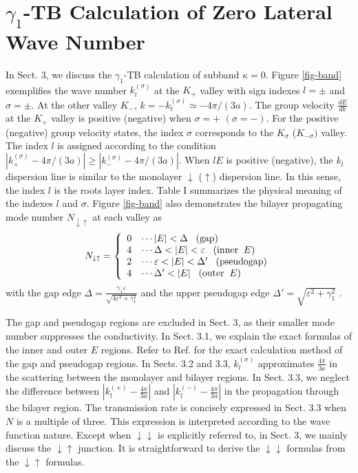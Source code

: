 \documentclass{jpsj3}
\begin{document}
\section{$\gamma_1$-TB Calculation of  Zero Lateral Wave Number }
In Sect. 3, we discuss the $\gamma_1$-TB
calculation of subband $\kappa=0$.
Figure \ref{fig-band} exemplifies the wave number $k_l^{(\sigma)}$ at the $K_+$ valley 
with sign indexes $l=\pm$ and $\sigma=\pm$.
At the other valley $K_-$, $k = -k^{(\sigma)}_l\simeq -4\pi/(3a)$.
The group velocity $\frac{dE}{dk}$ at the $K_+$ valley
is positive (negative) when $\sigma=+$ $(\sigma=-)$.
For the positive (negative) group velocity states,
the index $\sigma$ corresponds to the
$K_\sigma$ ($K_{-\sigma})$ valley.
The index $l$ is assigned according to the condition 
$\left|k^{(\sigma)}_+-4\pi/(3a) \right| \geq \left|k^{(\sigma)}_--4\pi/(3a)\right|$.
When $lE$ is positive (negative),
the $k_l$ dispersion line is similar to the monolayer $\downarrow$
($\uparrow$) dispersion line.
In this sense, the index $l$ is the roots layer index.
Table I summarizes the physical meaning of the indexes $l$ and $\sigma$.
Figure \ref{fig-band} also demonstrates the bilayer propagating mode number $N_{\downarrow\uparrow}$
at each valley 
as
\begin{equation}
N_{\downarrow\uparrow}
=
\left\{
\begin{array}{l}
0 \;\;\; \cdots |E| < \Delta\;\;\; ({\rm gap)}
\\
4 \;\;\; \cdots \Delta < |E| < \varepsilon\;\;\; ( {\rm inner \;\; } E)
\\
2 \;\;\; \cdots \varepsilon < |E| < \Delta'
\;\;\; ({\rm pseudogap)}
\\
4 \;\;\; \cdots \Delta' < |E| \;\;\; ({\rm outer \;\; } E)
\end{array}
\right.
\end{equation}
with the gap edge 
$\Delta =\frac{\gamma_1 \varepsilon}{\sqrt{4\varepsilon^2+\gamma_1^2}}$
and the upper pseudogap edge $\Delta' =\sqrt{\varepsilon^2+\gamma_1^2}$ \cite{a10.,a10-2.,a10.tuika,a10-note.} . 


The gap and pseudogap regions are
excluded in Sect. 3, as their smaller mode number suppresses 
the conductivity.
In Sect. 3.1, we explain the exact formulas of the inner and outer $E$
regions.
Refer to Ref. \cite{tamura-2019} for the exact calculation method of the gap and pseudogap regions.
In Sects. 3.2 and 3.3, $k_l^{(\sigma)}$ approximates $\frac{4\pi}{3a}$ 
in the scattering between the monolayer and bilayer regions.
In Sect. 3.3, we neglect the difference between
$\left|k_l^{(+)}-\frac{4\pi}{3a}\right|$ and
$\left|k_l^{(-)}-\frac{4\pi}{3a}\right|$
in the propagation through the bilayer region.
The transmission rate is concisely expressed in Sect. 3.3 when $N$ is a multiple of three. 
This expression is interpreted according to
the wave function nature.
Except when $\downarrow\downarrow$ is explicitly referred to,
 in Sect. 3, we mainly discuss the $\downarrow\uparrow$ junction.
It is straightforward to derive the $\downarrow\downarrow$ formulas
from the $\downarrow\uparrow$ formulas.
\end{document}
